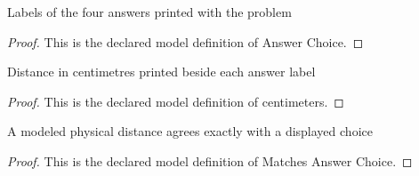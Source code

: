 \begin{definition}
  \label{def:physics:phyx-mini-0286:phyxminiproblems-problemphyxmini0286-answerchoice}
  Labels of the four answers printed with the problem
\end{definition}
\begin{proof}
  This is the declared model definition of Answer Choice.
\end{proof}
\begin{definition}[centimeters]
  \label{def:physics:phyx-mini-0286:phyxminiproblems-problemphyxmini0286-answerchoice-centimeters}
  Distance in centimetres printed beside each answer label
\end{definition}
\begin{proof}
  This is the declared model definition of centimeters.
\end{proof}
\begin{definition}
  \label{def:physics:phyx-mini-0286:phyxminiproblems-problemphyxmini0286-matchesanswerchoice}
  A modeled physical distance agrees exactly with a displayed choice
\end{definition}
\begin{proof}
  This is the declared model definition of Matches Answer Choice.
\end{proof}
